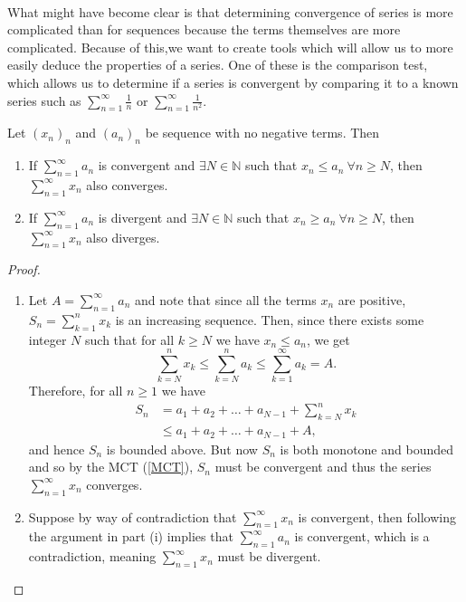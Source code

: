 \documentclass[../real_analysis.tex]{subfiles}
\begin{document}
        \paragraph{}
        What might have become clear is that determining convergence of series is more complicated than for sequences because the terms themselves are more complicated. Because of this,we want to create tools which will allow us to more easily deduce the properties of a series. One of these is the comparison test, which allows us to determine if a series is convergent by comparing it to a known series such as $\sum_{n=1}^\infty\frac{1}{n}$ or $\sum_{n=1}^\infty\frac{1}{n^2}$.
        \begin{theorem}\label{comparison-test}
            Let $(x_n)_n$ and $(a_n)_n$ be sequence with no negative terms. Then
            \begin{enumerate}[\upshape(i)]
                \item If $\sum_{n=1}^\infty a_n$ is convergent and $\exists N\in\mathbb{N}$ such that $x_n\leq a_n\ \forall n\geq N$, then $\sum_{n=1}^\infty x_n$ also converges.
                \item If $\sum_{n=1}^\infty a_n$ is divergent and $\exists N\in\mathbb{N}$ such that $x_n\geq a_n\ \forall n\geq N$, then $\sum_{n=1}^\infty x_n$ also diverges.
            \end{enumerate}
        \end{theorem}
        \begin{proof}\\
            \begin{enumerate}[\upshape(i)]
                \item Let $A=\sum_{n=1}^\infty a_n$ and note that since all the terms $x_n$ are positive, $S_n=\sum_{k=1}^n x_k$ is an increasing sequence. Then, since there exists some integer $N$ such that for all $k\geq N$ we have $x_n\leq a_n$, we get
                \begin{equation*}
                    \sum_{k=N}^n x_k\leq\sum_{k=N}^n a_k\leq\sum_{k=1}^\infty a_k=A.
                \end{equation*}
                Therefore, for all $n\geq1$ we have
                \begin{align*}
                    S_n&=a_1+a_2+\dots+a_{N-1}+\sum_{k=N}^n x_k\\
                    &\leq a_1+a_2+\dots+a_{N-1}+A,
                \end{align*}
                and hence $S_n$ is bounded above. But now $S_n$ is both monotone and bounded and so by the MCT (\ref{MCT}), $S_n$ must be convergent and thus the series $\sum_{n=1}^\infty x_n$ converges.
                \item Suppose by way of contradiction that $\sum_{n=1}^\infty x_n$ is convergent, then following the argument in part (i) implies that $\sum_{n=1}^\infty a_n$ is convergent, which is a contradiction, meaning $\sum_{n=1}^\infty x_n$ must be divergent.
            \end{enumerate}
        \end{proof}
\end{document}
